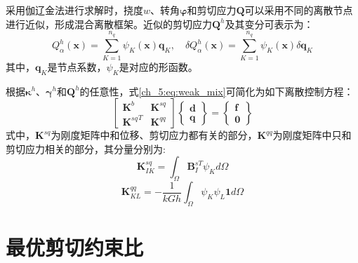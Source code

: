 采用伽辽金法进行求解时，挠度$w$、转角$\boldsymbol{\varphi}$和剪切应力$\boldsymbol{Q}$可以采用不同的离散节点进行近似，形成混合离散框架。近似的剪切应力$\boldsymbol{Q}^h$及其变分可表示为：
\begin{equation}\label{Q_h}
    Q^h_\alpha(\boldsymbol x) = \sum_{K=1}^{n_q} \psi_K(\boldsymbol x) \boldsymbol{q}_{K},\quad \delta Q^h_\alpha(\boldsymbol x) = \sum_{K=1}^{n_q} \psi_K(\boldsymbol x) \delta \boldsymbol{q}_{ K}
\end{equation}
其中，$\boldsymbol{q}_{ K}$是节点系数，$\psi_K$是对应的形函数。

根据$\boldsymbol\kappa^h$、$\boldsymbol\gamma^h$和$\boldsymbol Q^h$的任意性，式\eqref{ch_5:eq:weak_mix}可简化为如下离散控制方程：
\begin{equation} \label{equilibrium_mindlin_mix}
    \begin{bmatrix}\boldsymbol{K}^{b}&\boldsymbol{K}^{sq}\\{\boldsymbol{K}^{sq}}^T&\boldsymbol{K}^{qq}\end{bmatrix}
    \begin{Bmatrix}\boldsymbol{d}\\\boldsymbol{q}\end{Bmatrix}=
    \begin{Bmatrix}\boldsymbol{f}\\\boldsymbol{0}\end{Bmatrix}
\end{equation}
式中，$\boldsymbol K^{sq}$为刚度矩阵中和位移、剪切应力都有关的部分，$\boldsymbol K^{qq}$为刚度矩阵中只和剪切应力相关的部分，其分量分别为:
\begin{equation} 
    \boldsymbol K^{sq}_{IK} = \int_\Omega \boldsymbol B^{sT}_I \psi_K d\Omega
\end{equation} 
\begin{equation} 
    \boldsymbol K^{qq}_{KL} = -\frac{1}{kGh} \int_\Omega \psi_K \psi_L \boldsymbol 1 d\Omega
\end{equation}

\section{最优剪切约束比} 


